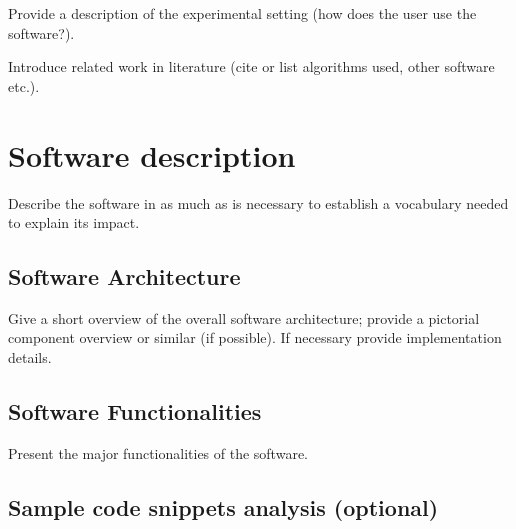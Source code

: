 \documentclass[preprint,12pt, a4paper]{elsarticle}
\begin{document}
Provide a description of the experimental setting (how does the user use the
software?).

Introduce related work in literature (cite or list algorithms used, other
software etc.).


\section{Software description}\label{sec:description}

Describe the software in as much as is necessary to establish a vocabulary
needed to explain its impact.


\subsection{Software Architecture}\label{sec:architecture}

Give a short overview of the overall software architecture; provide a
pictorial component overview or similar (if possible). If necessary provide
implementation details.


\subsection{Software Functionalities}\label{sec:functionalities}

Present the major functionalities of the software.


\subsection{Sample code snippets analysis (optional)}\label{sec:code}


\end{document}
